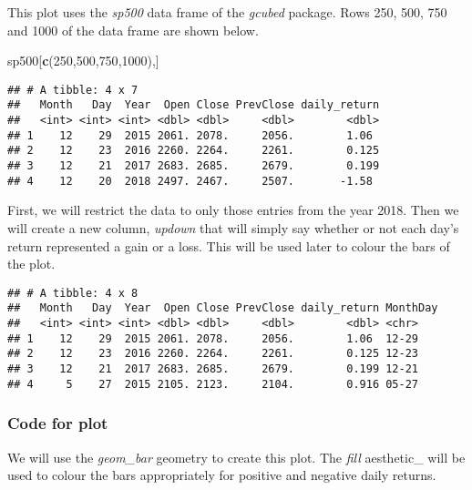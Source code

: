 \documentclass[]{book}
\newenvironment{Shaded}{\begin{snugshade}}{\end{snugshade}}
\newcommand{\DecValTok}[1]{\textcolor[rgb]{0.00,0.00,0.81}{#1}}
\newcommand{\KeywordTok}[1]{\textcolor[rgb]{0.13,0.29,0.53}{\textbf{#1}}}
\newcommand{\NormalTok}[1]{#1}
\begin{document}
This plot uses the \emph{sp500} data frame of the \emph{gcubed} package. Rows 250, 500, 750 and 1000 of the data frame are shown below.

\begin{Shaded}
\begin{Highlighting}[]
\NormalTok{sp500[}\KeywordTok{c}\NormalTok{(}\DecValTok{250}\NormalTok{,}\DecValTok{500}\NormalTok{,}\DecValTok{750}\NormalTok{,}\DecValTok{1000}\NormalTok{),]}
\end{Highlighting}
\end{Shaded}

\begin{verbatim}
## # A tibble: 4 x 7
##   Month   Day  Year  Open Close PrevClose daily_return
##   <int> <int> <int> <dbl> <dbl>     <dbl>        <dbl>
## 1    12    29  2015 2061. 2078.     2056.        1.06 
## 2    12    23  2016 2260. 2264.     2261.        0.125
## 3    12    21  2017 2683. 2685.     2679.        0.199
## 4    12    20  2018 2497. 2467.     2507.       -1.58
\end{verbatim}

First, we will restrict the data to only those entries from the year 2018. Then we will create a new column, \emph{updown} that will simply say whether or not each day's return represented a gain or a loss. This will be used later to colour the bars of the plot.

\begin{verbatim}
## # A tibble: 4 x 8
##   Month   Day  Year  Open Close PrevClose daily_return MonthDay
##   <int> <int> <int> <dbl> <dbl>     <dbl>        <dbl> <chr>   
## 1    12    29  2015 2061. 2078.     2056.        1.06  12-29   
## 2    12    23  2016 2260. 2264.     2261.        0.125 12-23   
## 3    12    21  2017 2683. 2685.     2679.        0.199 12-21   
## 4     5    27  2015 2105. 2123.     2104.        0.916 05-27
\end{verbatim}

\hypertarget{spfourcode}{%
\subsubsection*{Code for plot}\label{spfourcode}}

We will use the \emph{geom\_bar} geometry to create this plot. The \emph{fill} aesthetic\_ will be used to colour the bars appropriately for positive and negative daily returns.
\end{document}
